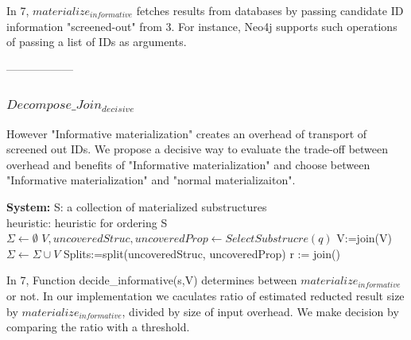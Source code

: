 In 7, $materialize_{informative}$ fetches results from databases by passing candidate ID information "screened-out" from 3. For instance, Neo4j supports such operations of passing a list of IDs as arguments.

------------------
\subsubsection{$Decompose\_Join_{decisive}$}
However "Informative materialization" creates an overhead of transport of screened out IDs. We propose a decisive way to evaluate the trade-off between overhead and benefits of "Informative materialization" and choose between "Informative materialization" and "normal materializaiton".

\begin{algorithm}[H]
	\caption{$Decompose\_Join_{decisive}$}
	\LinesNumbered
	\textbf{System:} S: a collection of materialized substructures\\ heuristic: heuristic for ordering S\\
	$\Sigma \gets \emptyset $\;
	$V, uncoveredStruc, uncoveredProp \gets SelectSubstrucre(q) $\;
	V:=join(V)\;
	$\Sigma \gets \Sigma \cup V $\;
	Splits:=split(uncoveredStruc, uncoveredProp)\;
	r := join(\Sigma)\;
\end{algorithm}
\clearpage

In 7, Function decide\_informative(s,V) determines between $materialize_{informative}$ or not. In our implementation we caculates ratio of estimated reducted result size by $materialize_{informative}$, divided by size of input overhead. We make decision by comparing the ratio with a threshold.
